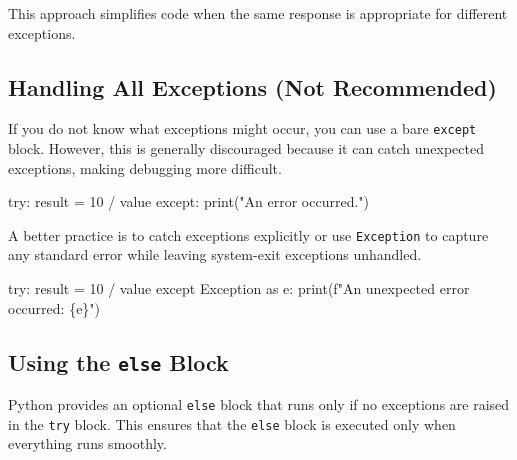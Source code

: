 \documentclass[
  letterpaper,
  DIV=11,
  numbers=noendperiod]{scrreprt}
\newenvironment{Shaded}{\begin{snugshade}}{\end{snugshade}}
\newcommand{\BuiltInTok}[1]{\textcolor[rgb]{0.00,0.23,0.31}{#1}}
\newcommand{\ControlFlowTok}[1]{\textcolor[rgb]{0.00,0.23,0.31}{#1}}
\newcommand{\DecValTok}[1]{\textcolor[rgb]{0.68,0.00,0.00}{#1}}
\newcommand{\ImportTok}[1]{\textcolor[rgb]{0.00,0.46,0.62}{#1}}
\newcommand{\NormalTok}[1]{\textcolor[rgb]{0.00,0.23,0.31}{#1}}
\newcommand{\OperatorTok}[1]{\textcolor[rgb]{0.37,0.37,0.37}{#1}}
\newcommand{\PreprocessorTok}[1]{\textcolor[rgb]{0.68,0.00,0.00}{#1}}
\newcommand{\SpecialCharTok}[1]{\textcolor[rgb]{0.37,0.37,0.37}{#1}}
\newcommand{\SpecialStringTok}[1]{\textcolor[rgb]{0.13,0.47,0.30}{#1}}
\newcommand{\StringTok}[1]{\textcolor[rgb]{0.13,0.47,0.30}{#1}}
\begin{document}
This approach simplifies code when the same response is appropriate for
different exceptions.

\hypertarget{handling-all-exceptions-not-recommended}{%
\subsection{Handling All Exceptions (Not
Recommended)}\label{handling-all-exceptions-not-recommended}}

If you do not know what exceptions might occur, you can use a bare
\texttt{except} block. However, this is generally discouraged because it
can catch unexpected exceptions, making debugging more difficult.

\begin{Shaded}
\begin{Highlighting}[]
\ControlFlowTok{try}\NormalTok{:}
\NormalTok{    result }\OperatorTok{=} \DecValTok{10} \OperatorTok{/}\NormalTok{ value}
\ControlFlowTok{except}\NormalTok{:}
    \BuiltInTok{print}\NormalTok{(}\StringTok{"An error occurred."}\NormalTok{)}
\end{Highlighting}
\end{Shaded}

A better practice is to catch exceptions explicitly or use
\texttt{Exception} to capture any standard error while leaving
system-exit exceptions unhandled.

\begin{Shaded}
\begin{Highlighting}[]
\ControlFlowTok{try}\NormalTok{:}
\NormalTok{    result }\OperatorTok{=} \DecValTok{10} \OperatorTok{/}\NormalTok{ value}
\ControlFlowTok{except} \PreprocessorTok{Exception} \ImportTok{as}\NormalTok{ e:}
    \BuiltInTok{print}\NormalTok{(}\SpecialStringTok{f"An unexpected error occurred: }\SpecialCharTok{\{}\NormalTok{e}\SpecialCharTok{\}}\SpecialStringTok{"}\NormalTok{)}
\end{Highlighting}
\end{Shaded}

\hypertarget{using-the-else-block}{%
\subsection{\texorpdfstring{Using the \texttt{else}
Block}{Using the else Block}}\label{using-the-else-block}}

Python provides an optional \texttt{else} block that runs only if no
exceptions are raised in the \texttt{try} block. This ensures that the
\texttt{else} block is executed only when everything runs smoothly.
\end{document}
